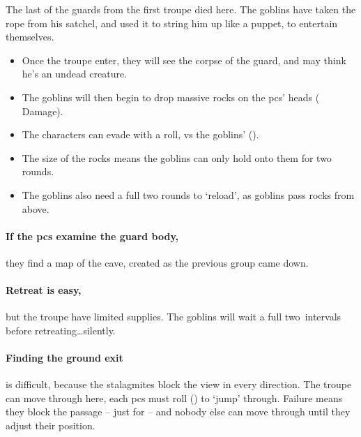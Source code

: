 \begin{multicols}{2}

\begin{exampletext}
  The last of the \glspl{guard} from the first troupe died here.
  The goblins have taken the rope from his satchel, and used it to string him up like a puppet, to entertain themselves.
\end{exampletext}


\begin{itemize}
  \item
  Once the troupe enter, they will see the corpse of the \gls{guard}, and may think he's an undead creature.
  \item
  The goblins will then begin to drop massive rocks on the \glspl{pc}' heads ( Damage).
  \item
  The characters can evade with a  roll, vs the goblins'  (\tn).
  \item
  The size of the rocks means the goblins can only hold onto them for two \glspl{round}.
  \item
  The goblins also need a full two rounds to `reload', as goblins pass rocks from above.
\end{itemize}

\paragraph{If the \glspl{pc} examine the \gls{guard} body,}
they find a map of the cave, created as the previous group came down.

\paragraph{Retreat is easy,}
but the troupe have limited supplies.
The goblins will wait a full two~\glspl{interval} before retreating\ldots silently.

\paragraph{Finding the ground exit}
is difficult, because the stalagmites block the view in every direction.
The troupe can move through here, each \glspl{pc} must roll  (\tn[10]) to `jump' through.
Failure means they block the passage -- just for  -- and nobody else can move through until they adjust their position.


\end{multicols}
